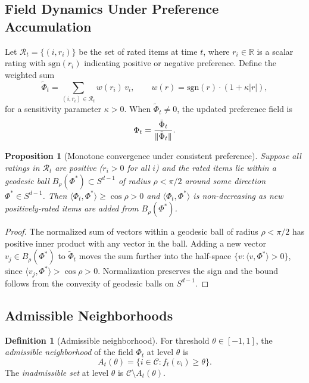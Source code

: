 \documentclass[12pt, a4paper]{article}
\DeclarePairedDelimiter{\norm}{\lVert}{\rVert}
\theoremstyle{plain}
\newtheorem{proposition}{Proposition}[section]
\theoremstyle{definition}
\newtheorem{definition}{Definition}[section]
\begin{document}
\subsection{Field Dynamics Under Preference Accumulation}

Let $\mathcal{R}_t = \{(i, r_i)\}$ be the set of rated items at time $t$,
where $r_i \in \mathbb{R}$ is a scalar rating with $\mathrm{sgn}(r_i)$
indicating positive or negative preference. Define the weighted sum
\begin{equation}
  \tilde{\Phi}_t = \sum_{(i, r_i) \in \mathcal{R}_t} w(r_i)\, v_i,
  \qquad w(r) = \mathrm{sgn}(r) \cdot (1 + \kappa |r|),
\end{equation}
for a sensitivity parameter $\kappa > 0$. When $\tilde{\Phi}_t \neq 0$, the
updated preference field is
\begin{equation}
  \label{eq:field-update}
  \Phi_t = \frac{\tilde{\Phi}_t}{\norm{\tilde{\Phi}_t}}.
\end{equation}

\begin{proposition}[Monotone convergence under consistent preference]
\label{prop:convergence}
Suppose all ratings in $\mathcal{R}_t$ are positive ($r_i > 0$ for all $i$)
and the rated items lie within a geodesic ball $B_\rho(\Phi^*) \subset
S^{d-1}$ of radius $\rho < \pi/2$ around some direction $\Phi^* \in
S^{d-1}$. Then $\langle \Phi_t, \Phi^* \rangle \ge \cos\rho > 0$ and
$\langle \Phi_t, \Phi^* \rangle$ is non-decreasing as new positively-rated
items are added from $B_\rho(\Phi^*)$.
\end{proposition}

\begin{proof}
The normalized sum of vectors within a geodesic ball of radius $\rho <
\pi/2$ has positive inner product with any vector in the ball. Adding a
new vector $v_j \in B_\rho(\Phi^*)$ to $\tilde{\Phi}_t$ moves the sum
further into the half-space $\{v : \langle v, \Phi^* \rangle > 0\}$,
since $\langle v_j, \Phi^* \rangle > \cos\rho > 0$. Normalization
preserves the sign and the bound follows from the convexity of geodesic
balls on $S^{d-1}$.
\end{proof}

\subsection{Admissible Neighborhoods}

\begin{definition}[Admissible neighborhood]
For threshold $\theta \in [-1, 1]$, the \emph{admissible neighborhood} of
the field $\Phi_t$ at level $\theta$ is
\begin{equation}
  A_t(\theta) = \{i \in \mathcal{C} : f_t(v_i) \ge \theta\}.
\end{equation}
The \emph{inadmissible set} at level $\theta$ is $\mathcal{C} \setminus
A_t(\theta)$.
\end{definition}
\end{document}

